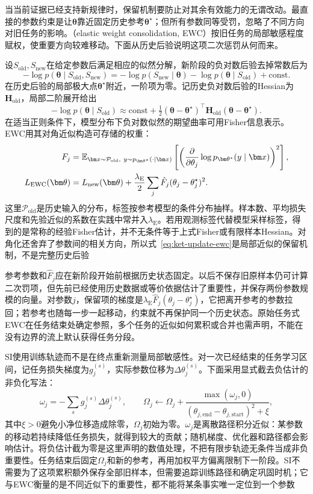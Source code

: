当当前证据已经支持新规律时，保留机制要防止对其余有效能力的无谓改动。最直接的参数约束是让$\bm\theta$靠近固定历史参考$\bm\theta^\star$；但所有参数同等受罚，忽略了不同方向对旧任务的影响。（elastic weight consolidation, EWC）按旧任务的局部敏感程度赋权，使重要方向较难移动。下面从历史后验说明这项二次惩罚从何而来。

设$S_{\mathrm{old}},S_{\mathrm{new}}$在给定参数后满足相应的似然分解，新阶段的负对数后验去掉常数后为
\[
-\log p(\bm\theta\mid S_{\mathrm{old}},S_{\mathrm{new}})
=-\log p(S_{\mathrm{new}}\mid\bm\theta)
-\log p(\bm\theta\mid S_{\mathrm{old}})+\mathrm{const}.
\]
在历史后验的局部极大点$\bm\theta^\star$附近，一阶项为零。记历史负对数后验的Hessian为$\bm H_{\mathrm{old}}$，局部二阶展开给出
\[
-\log p(\bm\theta\mid S_{\mathrm{old}})
\approx\mathrm{const}
+\tfrac12(\bm\theta-\bm\theta^\star)^\top
\bm H_{\mathrm{old}}(\bm\theta-\bm\theta^\star).
\]
在适当正则条件下，模型分布下负对数似然的期望曲率可用Fisher信息表示。EWC用其对角近似构造可存储的权重：
\begin{align}
F_j&=\mathbb E_{\bm x\sim\mathcal P_{\mathrm{old}},\
y\sim p_{\bm\theta^\star}(\cdot\mid\bm x)}
\left[
\left(\frac{\partial}{\partial\theta_j}
\log p_{\bm\theta^\star}(y\mid\bm x)\right)^2
\right],\notag\\
L_{\mathrm{EWC}}(\bm\theta)
&=L_{\mathrm{new}}(\bm\theta)
+\frac{\lambda_{\mathrm E}}2
\sum_j\hat F_j(\theta_j-\theta_j^\star)^2.
\label{eq:ket-update-ewc}
\end{align}
这里$\mathcal P_{\mathrm{old}}$是历史输入的分布，标签按参考模型的条件分布抽样。样本数、平均损失尺度和先验近似的系数在实践中常并入$\lambda_{\mathrm E}$。若用观测标签代替模型采样标签，得到的是常称的经验Fisher估计，并不无条件等于上式Fisher或有限样本Hessian。对角化还舍弃了参数间的相关方向，所以式~\eqref{eq:ket-update-ewc}是局部近似的保留机制，不是完整历史后验

参考参数和$\hat F_j$应在新阶段开始前根据历史状态固定。以后不保存旧原样本仍可计算二次罚项，但先前已经使用历史数据或等价依据估计了重要性，并保存两份参数规模的向量。对参数$j$，保留项的梯度是$\lambda_{\mathrm E}\hat F_j(\theta_j-\theta_j^\star)$，它把离开参考的参数拉回；若参考也随每一步一起移动，约束就不再保护同一个历史状态。原始任务式EWC在任务结束处确定参照，多个任务的近似如何累积或合并也需声明，不能在没有边界的流上默认获得任务分段。

SI使用训练轨迹而不是在终点重新测量局部敏感性。对一次已经结束的任务学习区间，记任务损失梯度为$g_j^{(s)}$，实际参数位移为$\Delta\theta_j^{(s)}$。下面采用显式截去负估计的非负化写法：
\[
\omega_j=-\sum_s g_j^{(s)}\Delta\theta_j^{(s)},\qquad
\Omega_j\leftarrow\Omega_j+
\frac{\max(\omega_j,0)}{(\theta_{j,\mathrm{end}}-\theta_{j,\mathrm{start}})^2+\xi},
\]
其中$\xi>0$避免小净位移造成除零，$\Omega_j$初始为零。$\omega_j$是离散路径积分近似：某参数的移动若持续降低任务损失，就得到较大的贡献；随机梯度、优化器和路径都会影响估计。将负估计截为零是这里声明的数值处理，不把有限步轨迹无条件当成非负重要性。任务结束后固定$\Omega_j$和新的参考，再用加权平方偏离限制下一阶段。SI不需要为了这项累积额外保存全部旧样本，但需要追踪训练路径和确定巩固时机；它与EWC衡量的是不同近似下的重要性，都不能将某条事实唯一定位到一个参数

